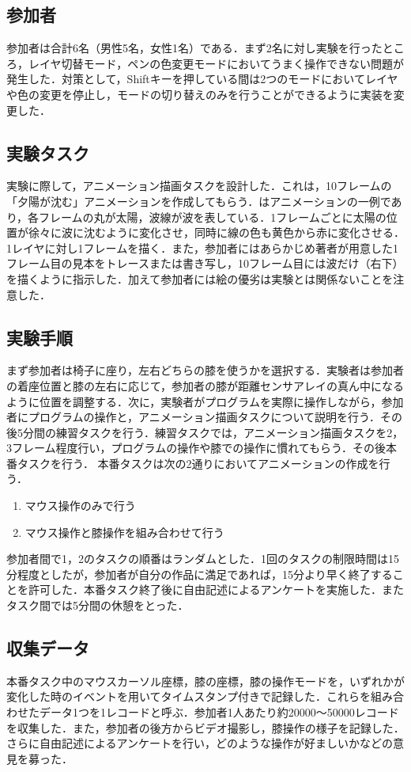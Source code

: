 \documentclass[submit, techrep]{ipsj}
\begin{document}
\subsection{参加者}
参加者は合計6名（男性5名，女性1名）である．まず2名に対し実験を行ったところ，レイヤ切替モード，ペンの色変更モードにおいてうまく操作できない問題が発生した．対策として，Shiftキーを押している間は2つのモードにおいてレイヤや色の変更を停止し，モードの切り替えのみを行うことができるように実装を変更した．
\subsection{実験タスク}
実験に際して，アニメーション描画タスクを設計した．これは，10フレームの「夕陽が沈む」アニメーションを作成してもらう．はアニメーションの一例であり，各フレームの丸が太陽，波線が波を表している．1フレームごとに太陽の位置が徐々に波に沈むように変化させ，同時に線の色も黄色から赤に変化させる．1レイヤに対し1フレームを描く．また，参加者にはあらかじめ著者が用意した1フレーム目の見本をトレースまたは書き写し，10フレーム目には波だけ（右下）を描くように指示した．加えて参加者には絵の優劣は実験とは関係ないことを注意した．
\subsection{実験手順}
まず参加者は椅子に座り，左右どちらの膝を使うかを選択する．実験者は参加者の着座位置と膝の左右に応じて，参加者の膝が距離センサアレイの真ん中になるように位置を調整する．次に，実験者がプログラムを実際に操作しながら，参加者にプログラムの操作と，アニメーション描画タスクについて説明を行う．その後5分間の練習タスクを行う．練習タスクでは，アニメーション描画タスクを2，3フレーム程度行い，プログラムの操作や膝での操作に慣れてもらう．その後本番タスクを行う．
本番タスクは次の2通りにおいてアニメーションの作成を行う．
\begin{enumerate}
	\item マウス操作のみで行う
	\item マウス操作と膝操作を組み合わせて行う
\end{enumerate}
参加者間で1，2のタスクの順番はランダムとした．1回のタスクの制限時間は15分程度としたが，参加者が自分の作品に満足であれば，15分より早く終了することを許可した．本番タスク終了後に自由記述によるアンケートを実施した．またタスク間では5分間の休憩をとった．
\subsection{収集データ}
本番タスク中のマウスカーソル座標，膝の座標，膝の操作モードを，いずれかが変化した時のイベントを用いてタイムスタンプ付きで記録した．これらを組み合わせたデータ1つを1レコードと呼ぶ．参加者1人あたり約20000〜50000レコードを収集した．また，参加者の後方からビデオ撮影し，膝操作の様子を記録した．さらに自由記述によるアンケートを行い，どのような操作が好ましいかなどの意見を募った．
\end{document}
